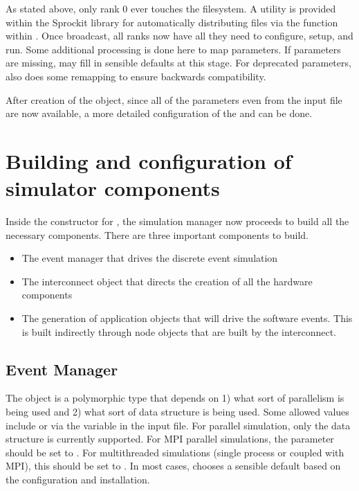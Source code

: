 As stated above, only rank 0 ever touches the filesystem.
A utility is provided within the Sprockit library for automatically distributing files via the  function within .
Once broadcast, all ranks now have all they need to configure, setup, and run.
Some additional processing is done here to map parameters.
If parameters are missing, \sstmacro may fill in sensible defaults at this stage.
For deprecated parameters, \sstmacro also does some remapping to ensure backwards compatibility.

After creation of the  object, 
since all of the parameters even from the input file are now available,
a more detailed configuration of the  and  can be done.

\section{Building and configuration of simulator components}\label{sec:buildConfig}
Inside the constructor for ,
the simulation manager now proceeds to build all the necessary components.
There are three important components to build.

\begin{itemize}
\item The event manager that drives the discrete event simulation
\item The interconnect object that directs the creation of all the hardware components
\item The generation of application objects that will drive the software events. This is built indirectly through node objects that are built by the interconnect.
\end{itemize}

\subsection{Event Manager}\label{sec:eventMan}
The  object is a polymorphic type that depends on 1) what sort of parallelism is being used and 2) what sort of data structure is being used.
Some allowed values include  or  via the  variable in the input file.
For parallel simulation, only the  data structure is currently supported.
For MPI parallel simulations, the  parameter should be set to .
For multithreaded simulations (single process or coupled with MPI), this should be set to .
In most cases, \sstmacro chooses a sensible default based on the configuration and installation.

